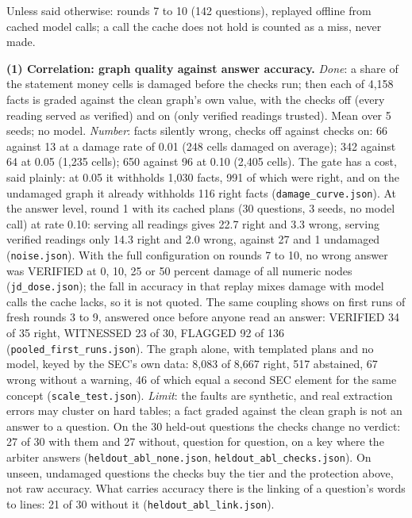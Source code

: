 \documentclass[10pt]{article}
\newcommand{\head}[1]{\vspace{5pt}{\normalsize\bfseries #1}\vspace{1pt}\par}
\newcommand{\sub}[1]{\textbf{#1}}
\newcommand{\rf}[1]{{\footnotesize\texttt{#1}}}
\begin{document}
\head{3. Four measurements, one per research direction of the role}
Unless said otherwise: rounds 7 to 10 (142 questions), replayed offline from cached model calls; a call the cache does not hold is counted as a miss, never made.

\sub{(1) Correlation: graph quality against answer accuracy.} \emph{Done}: a share of the statement money cells is damaged before the checks run; then each of 4,158 facts is graded against the clean graph's own value, with the checks off (every reading served as verified) and on (only verified readings trusted). Mean over 5 seeds; no model. \emph{Number}: facts silently wrong, checks off against checks on: 66 against 13 at a damage rate of 0.01 (248 cells damaged on average); 342 against 64 at 0.05 (1,235 cells); 650 against 96 at 0.10 (2,405 cells). The gate has a cost, said plainly: at 0.05 it withholds 1,030 facts, 991 of which were right, and on the undamaged graph it already withholds 116 right facts (\rf{damage\_curve.json}). At the answer level, round 1 with its cached plans (30 questions, 3 seeds, no model call) at rate 0.10: serving all readings gives 22.7 right and 3.3 wrong, serving verified readings only 14.3 right and 2.0 wrong, against 27 and 1 undamaged (\rf{noise.json}). With the full configuration on rounds 7 to 10, no wrong answer was VERIFIED at 0, 10, 25 or 50 percent damage of all numeric nodes (\rf{jd\_dose.json}); the fall in accuracy in that replay mixes damage with model calls the cache lacks, so it is not quoted. The same coupling shows on first runs of fresh rounds 3 to 9, answered once before anyone read an answer: VERIFIED 34 of 35 right, WITNESSED 23 of 30, FLAGGED 92 of 136 (\rf{pooled\_first\_runs.json}). The graph alone, with templated plans and no model, keyed by the SEC's own data: 8,083 of 8,667 right, 517 abstained, 67 wrong without a warning, 46 of which equal a second SEC element for the same concept (\rf{scale\_test.json}). \emph{Limit}: the faults are synthetic, and real extraction errors may cluster on hard tables; a fact graded against the clean graph is not an answer to a question. On the 30 held-out questions the checks change no verdict: 27 of 30 with them and 27 without, question for question, on a key where the arbiter answers (\rf{heldout\_abl\_none.json}, \rf{heldout\_abl\_checks.json}). On unseen, undamaged questions the checks buy the tier and the protection above, not raw accuracy. What carries accuracy there is the linking of a question's words to lines: 21 of 30 without it (\rf{heldout\_abl\_link.json}).
\end{document}

